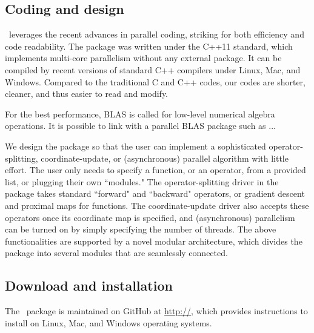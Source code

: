 \subsection{Coding and design}
\pkg~leverages the recent advances in parallel coding, striking for both efficiency and code readability. The package was written under the C++11 standard, which implements multi-core parallelism without any external package. It can be compiled by  recent versions of standard C++ compilers  under Linux, Mac, and Windows. Compared to the traditional C and C++ codes, our codes  are shorter, cleaner, and thus easier to read and modify. 

For the best performance, BLAS is called for low-level numerical algebra operations. It is possible to link with a parallel BLAS package such as ... 

We design the package so that the user can implement a sophisticated operator-splitting, coordinate-update, or (asynchronous) parallel algorithm  with little effort. The user only needs to specify a function, or an operator, from a provided list, or plugging their own ``modules." The operator-splitting driver in the package takes standard ``forward" and ``backward" operators, or gradient descent and proximal maps for functions. The coordinate-update driver also accepts these  operators once its coordinate map is specified, and (asynchronous) parallelism can be turned on by simply specifying the number of threads.
The above functionalities are supported by a  novel modular architecture, which divides the package into several modules that are seamlessly connected.   

 

\subsection{Download and installation}
The \pkg~package is maintained on GitHub at \url{http://}, which provides instructions to install on Linux, Mac, and Windows operating systems.  

